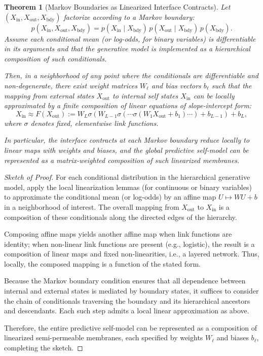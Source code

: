 \documentclass[12pt,letterpaper]{article}
\newtheorem{theorem}{Theorem}[section]
\theoremstyle{remark}
\begin{document}
\begin{theorem}[Markov Boundaries as Linearized Interface Contracts]
Let $(X_{\text{in}}, X_{\text{out}}, X_{\text{bdy}})$ factorize according to a Markov boundary:
\[
p(X_{\text{in}}, X_{\text{out}}, X_{\text{bdy}})
= p(X_{\text{in}} \mid X_{\text{bdy}})\, p(X_{\text{out}} \mid X_{\text{bdy}})\, p(X_{\text{bdy}}).
\]
Assume each conditional mean (or log-odds, for binary variables) is differentiable in its arguments and that the generative model is implemented as a hierarchical composition of such conditionals.

Then, in a neighborhood of any point where the conditionals are differentiable and non-degenerate, there exist weight matrices $W_\ell$ and bias vectors $b_\ell$ such that the mapping from external states $X_{\text{out}}$ to internal self states $X_{\text{in}}$ can be locally approximated by a finite composition of linear equations of slope-intercept form:
\[
X_{\text{in}} \approx F(X_{\text{out}}) := W_L \sigma(W_{L-1} \sigma(\cdots \sigma(W_1 X_{\text{out}} + b_1) \cdots ) + b_{L-1}) + b_L,
\]
where $\sigma$ denotes fixed, elementwise link functions.

In particular, the interface contracts at each Markov boundary reduce locally to linear maps with weights and biases, and the global predictive self-model can be represented as a matrix-weighted composition of such linearized membranes.
\end{theorem}

\begin{proof}[Sketch of Proof]
For each conditional distribution in the hierarchical generative model, apply the local linearization lemmas (for continuous or binary variables) to approximate the conditional mean (or log-odds) by an affine map $U \mapsto W U + b$ in a neighborhood of interest. The overall mapping from $X_{\text{out}}$ to $X_{\text{in}}$ is a composition of these conditionals along the directed edges of the hierarchy.

Composing affine maps yields another affine map when link functions are identity; when non-linear link functions are present (e.g., logistic), the result is a composition of linear maps and fixed non-linearities, i.e., a layered network. Thus, locally, the composed mapping is a function of the stated form.

Because the Markov boundary condition ensures that all dependence between internal and external states is mediated by boundary states, it suffices to consider the chain of conditionals traversing the boundary and its hierarchical ancestors and descendants. Each such step admits a local linear approximation as above.

Therefore, the entire predictive self-model can be represented as a composition of linearized semi-permeable membranes, each specified by weights $W_\ell$ and biases $b_\ell$, completing the sketch.
\end{proof}
\end{document}
